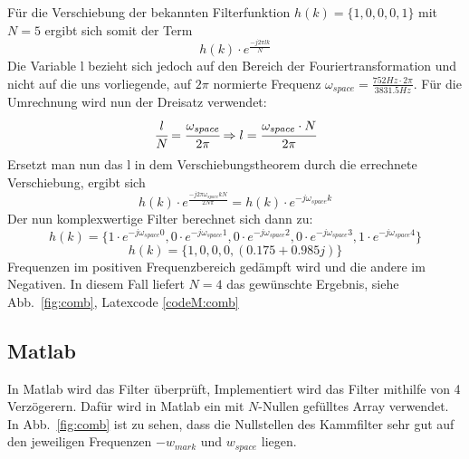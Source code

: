 \documentclass{article}
\begin{document}
Für die Verschiebung der bekannten Filterfunktion $h(k) = \{1,0,0,0,1\}$ mit $N=5$ ergibt sich somit der Term
$$
h(k) \cdot e^{\frac{-j2\pi{lk}}{N}}
$$
Die Variable l bezieht sich jedoch auf den Bereich der Fouriertransformation und nicht auf die uns vorliegende, auf $2\pi$ normierte Frequenz $\omega_{space} = \frac{752Hz\cdot{2\pi}}{3831.5Hz}$. Für die Umrechnung wird nun der Dreisatz verwendet:
$$
\cfrac{l}{N} = \cfrac{\omega_{space}}{2\pi} \Rightarrow l=\cfrac{\omega_{space} \cdot N}{2\pi}
$$
Ersetzt man nun das l in dem Verschiebungstheorem durch die errechnete Verschiebung, ergibt sich
$$
h(k) \cdot e^{\frac{-j2\pi\omega_{space}kN}{2N\pi}} = h(k) \cdot e^{-j\omega_{space}k}
$$
Der nun komplexwertige Filter berechnet sich dann zu:
$$
h(k) = \{ 1 \cdot e^{-j\omega_{space}0} , 0 \cdot e^{-j\omega_{space}1} , 0 \cdot e^{-j\omega_{space}2} , 0 \cdot e^{-j\omega_{space}3} , 1 \cdot e^{-j\omega_{space}4}\}
$$
$$
h(k) = \{ 1, 0, 0, 0, (0.175 + 0.985j) \}
$$
Frequenzen im positiven Frequenzbereich gedämpft wird und die andere im Negativen. In diesem Fall liefert $N = 4$ das gewünschte Ergebnis, siehe Abb.~\ref{fig:comb}, Latexcode \ref{codeM:comb}

\subsection{Matlab}
In Matlab wird das Filter überprüft, Implementiert wird das Filter mithilfe von 4 Verzögerern.
Dafür wird in Matlab ein mit $N$-Nullen gefülltes Array verwendet. In Abb.~\ref{fig:comb} ist zu sehen,
dass die Nullstellen des Kammfilter sehr gut auf den jeweiligen Frequenzen $- w_{mark}$ und $w_{space}$ liegen.

%    
%    
\end{document}
